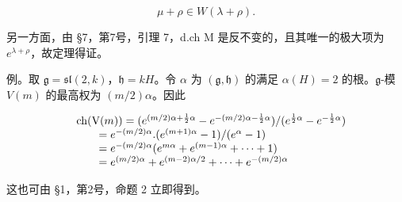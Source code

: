 \[
\mu + \rho \in W (\lambda + \rho).
\]

另一方面，由 §7，第7号，引理 7，d.ch M 是反不变的，且其唯一的极大项为 \(e^{\lambda+\rho}\)，故定理得证。

例。取 \(\mathfrak{g} = \mathfrak{sl}(2,k)\)，\(\mathfrak{h} = kH\)。令 \(\alpha\) 为 \((\mathfrak{g},\mathfrak{h})\) 的满足 \(\alpha (H) = 2\) 的根。\(\mathfrak{g}\)-模 \(V(m)\) 的最高权为 \((m / 2)\alpha\)。因此

\[
\begin{array}{r l} & {\mathrm{ch} (\mathrm{V} (m)) = (e ^ {(m / 2) \alpha + \frac {1}{2} \alpha} - e ^ {- (m / 2) \alpha - \frac {1}{2} \alpha}) / (e ^ {\frac {1}{2} \alpha} - e ^ {- \frac {1}{2} \alpha})} \\ & {\qquad = e ^ {- (m / 2) \alpha}. (e ^ {(m + 1) \alpha} - 1) / (e ^ {\alpha} - 1)} \\ & {\qquad = e ^ {- (m / 2) \alpha} (e ^ {m \alpha} + e ^ {(m - 1) \alpha} + \dots + 1)} \\ & {\qquad = e ^ {(m / 2) \alpha} + e ^ {(m - 2) \alpha / 2} + \dots + e ^ {- (m / 2) \alpha}} \end{array}
\]

这也可由 §1，第2号，命题 2 立即得到。

